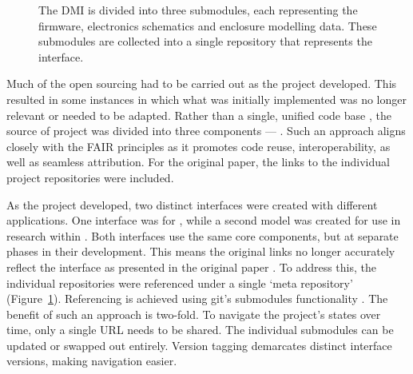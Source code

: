 \begin{figure}[b]
    \centering
    \caption{The DMI is divided into three submodules, each representing the firmware, electronics schematics and enclosure modelling data. These submodules are collected into a single repository that represents the interface.}
    \label{fig:repo-relation}
\end{figure}


Much of the open sourcing had to be carried out as the project developed. This resulted in some instances in which what was initially implemented was no longer relevant or needed to be adapted.
Rather than a single, unified code base \cite{calegario_documentation_2021, fiordelmondo_longevity_2024}, the source of project was divided into three components
--- .
Such an approach aligns closely with the FAIR principles as it promotes code reuse, interoperability, as well as seamless attribution.
For the original paper, the links to the individual project repositories were included.



As the project developed, two distinct interfaces were created with different applications. One interface was for , while a second model was created for use in research within . Both interfaces use the same core components, but at separate phases in their development. This means the original links no longer accurately reflect the interface as presented in the original paper . To address this, the individual repositories were referenced under a single `meta repository' (Figure~\ref{fig:repo-relation}). Referencing is achieved using git's submodules functionality \cite{git_submodule_2025}. The benefit of such an approach is two-fold.
To navigate the project's states over time, only a single URL needs to be shared. The individual submodules can be updated or swapped out entirely.
Version tagging demarcates distinct interface versions, making navigation easier.

